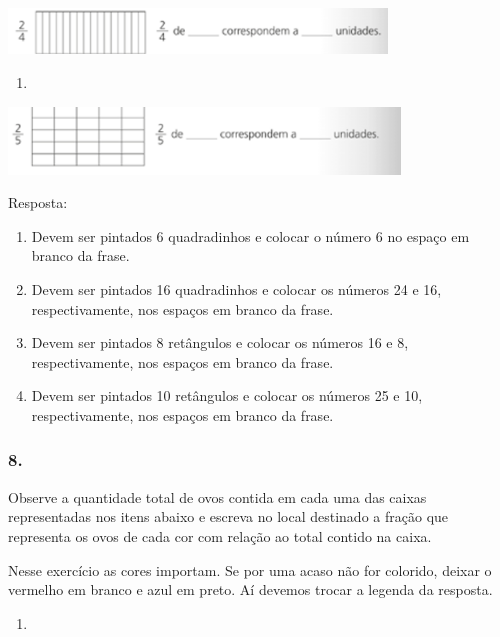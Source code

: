 \includegraphics[width=3.95868in,height=0.48337in]{media/image116.png}

\begin{enumerate}
\def\labelenumi{\alph{enumi})}
\item
\end{enumerate}

\includegraphics[width=4.09202in,height=0.70839in]{media/image117.png}

Resposta:

\begin{enumerate}
\def\labelenumi{\alph{enumi})}
\item
  Devem ser pintados 6 quadradinhos e colocar o número 6 no espaço em
  branco da frase.
\item
  Devem ser pintados 16 quadradinhos e colocar os números 24 e 16,
  respectivamente, nos espaços em branco da frase.
\item
  Devem ser pintados 8 retângulos e colocar os números 16 e 8,
  respectivamente, nos espaços em branco da frase.
\item
  Devem ser pintados 10 retângulos e colocar os números 25 e 10,
  respectivamente, nos espaços em branco da frase.
\end{enumerate}

\subsubsection{8.}\label{section-111}

Observe a quantidade total de ovos contida em cada uma das caixas
representadas nos itens abaixo e escreva no local destinado a fração que
representa os ovos de cada cor com relação ao total contido na caixa.

Nesse exercício as cores importam. Se por uma acaso não for colorido,
deixar o vermelho em branco e azul em preto. Aí devemos trocar a legenda
da resposta.

\begin{enumerate}
\def\labelenumi{\alph{enumi})}
\item
\end{enumerate}

